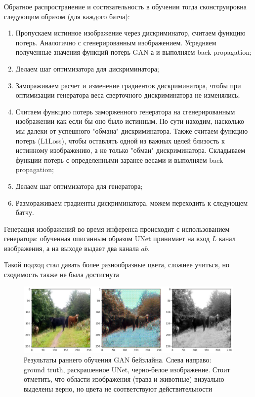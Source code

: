 \documentclass[14pt]{article}
\begin{document}
Обратное распространение и состязательность в обучении тогда сконструировна следующим образом (для каждого батча):
\begin{enumerate}
    \item Пропускаем истинное изображение через дискриминатор, считаем функцию потерь. Аналогично с сгенерированным изображением.
    Усредняем полученные значения функций потерь GAN-а и выполняем back propagation;
    \item Делаем шаг оптимизатора для дискриминатора;
    \item Замораживаем расчет и изменение градиентов дискриминатора, чтобы при оптимизации генератора веса сверточного дискриминатора не изменялись;
    \item Считаем функцию потерь заморженного генератора на сгенерированным изображении как если бы оно было истинным. По сути
    находим, насколько мы далеки от успешного "обмана" дискриминатора. Также считаем функцию потерь (L1Loss), чтобы оставлять одной из важных целей
    близость к истинному изображению, а не только "обман" дискриминатора.
    Складываем функции потерь с определенными заранее весами и выполняем back propagation;
    \item Делаем шаг оптимизатора для генератора;
    \item Размораживаем градиенты дискриминатора, можем переходить к следующем батчу.
\end{enumerate}

Генерация изображений во время инференса происходит с использованием генератора: обученная описанным образом UNet принимает на вход
$L$ канал изображения, а на выходе выдает два канала $ab$.

Такой подход стал давать более разнообразные цвета, сложнее учиться, но сходимость также не была достигнута

\begin{figure}[H]
    \centering
    \includegraphics[width=1.0\textwidth]{resources/middle_of_gan_baseline.png}
    \caption{Результаты раннего обучения GAN бейзлайна. Слева направо: ground truth, раскрашенное UNet, черно-белое изображение. Стоит отметить,
    что области изображения (трава и животные) визуально выделены верно, но цвета не соответствуют действительности}
    \label{fig:id_figura}
\end{figure}
\end{document}

